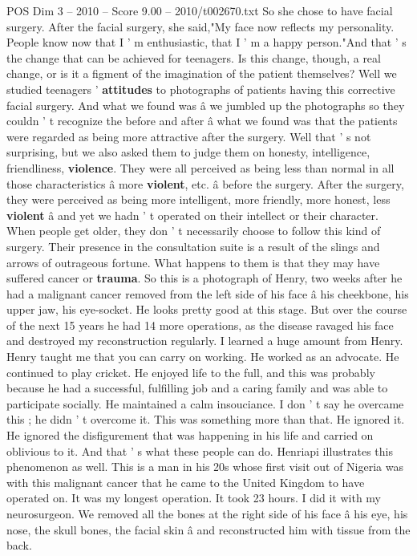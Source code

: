 \begin{textsample}{POS Dim 3 – 2010 – Score 9.00 – 2010/t002670.txt}
So she chose to have facial surgery.
After the facial surgery, she said,"My face now reflects my personality.
People know now that I ' m enthusiastic, that I ' m a happy person."And that ' s the change that can be achieved for teenagers.
Is this change, though, a real change, or is it a figment of the imagination of the patient themselves?
Well we studied teenagers ' \textbf{attitudes} to photographs of patients having this corrective facial surgery.
And what we found was â we jumbled up the photographs so they couldn ' t recognize the before and after â what we found was that the patients were regarded as being more attractive after the surgery.
Well that ' s not surprising, but we also asked them to judge them on honesty, intelligence, friendliness, \textbf{violence}.
They were all perceived as being less than normal in all those characteristics â more \textbf{violent}, etc. â before the surgery.
After the surgery, they were perceived as being more intelligent, more friendly, more honest, less \textbf{violent} â and yet we hadn ' t operated on their intellect or their character.
When people get older, they don ' t necessarily choose to follow this kind of surgery.
Their presence in the consultation suite is a result of the slings and arrows of outrageous fortune.
What happens to them is that they may have suffered cancer or \textbf{trauma}.
So this is a photograph of Henry, two weeks after he had a malignant cancer removed from the left side of his face â his cheekbone, his upper jaw, his eye-socket.
He looks pretty good at this stage.
But over the course of the next 15 years he had 14 more operations, as the disease ravaged his face and destroyed my reconstruction regularly.
I learned a huge amount from Henry.
Henry taught me that you can carry on working.
He worked as an advocate.
He continued to play cricket.
He enjoyed life to the full, and this was probably because he had a successful, fulfilling job and a caring family and was able to participate socially.
He maintained a calm insouciance.
I don ' t say he overcame this ; he didn ' t overcome it.
This was something more than that.
He ignored it.
He ignored the disfigurement that was happening in his life and carried on oblivious to it.
And that ' s what these people can do.
Henriapi illustrates this phenomenon as well.
This is a man in his 20s whose first visit out of Nigeria was with this malignant cancer that he came to the United Kingdom to have operated on.
It was my longest operation.
It took 23 hours.
I did it with my neurosurgeon.
We removed all the bones at the right side of his face â his eye, his nose, the skull bones, the facial skin â and reconstructed him with tissue from the back.

\end{textsample}
